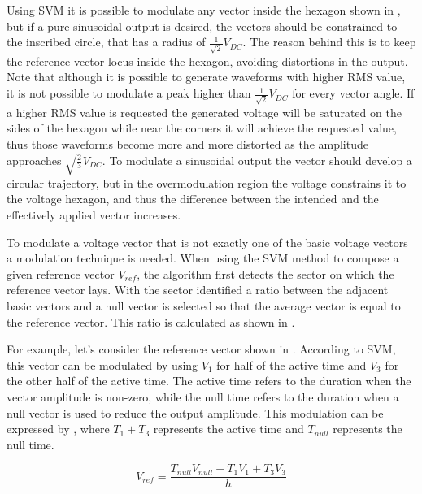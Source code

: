 \documentclass[9pt,conference]{IEEEtran}
\begin{document}
Using SVM it is possible to modulate any vector inside the hexagon shown in , but if a pure sinusoidal output is desired, the vectors should be constrained to the inscribed circle, that has a radius of $\frac{1}{\sqrt{2}} V_{DC}$. The reason behind this is to keep the reference vector locus inside the hexagon, avoiding distortions in the output. Note that although it is possible to generate waveforms with higher RMS value, it is not possible to modulate a peak higher than $\frac{1}{\sqrt{2}} V_{DC}$ for every vector angle. If a higher RMS value is requested the generated voltage will be saturated on the sides of the hexagon while near the corners it will achieve the requested value, thus those waveforms become more and more distorted as the amplitude approaches $\sqrt{\frac{2}{3}} V_{DC}$. To modulate a sinusoidal output the vector should develop a circular trajectory, but in the overmodulation region the voltage constrains it to the voltage hexagon, and thus the difference between the intended and the effectively applied vector increases.

To modulate a voltage vector that is not exactly one of the basic voltage vectors a modulation technique is needed. When using the SVM method to compose a given reference vector $V_{ref}$, the algorithm first detects the sector on which the reference vector lays. With the sector identified a ratio between the adjacent basic vectors and a null vector is selected so that the average vector is equal to the reference vector. This ratio is calculated as shown in .

For example, let's consider the reference vector shown in . According to SVM, this vector can be modulated by using $V_1$ for half of the active time and $V_3$ for the other half of the active time. The active time refers to the duration when the vector amplitude is non-zero, while the null time refers to the duration when a null vector is used to reduce the output amplitude. This modulation can be expressed by , where $T_1+T_3$ represents the active time and $T_{null}$ represents the null time.

\begin{equation}
	V_{ref} = \frac{T_{null} V_{null} + T_1 V_1  + T_3 V_3}{h}
	\label{eq:svm_vref}
\end{equation}

\end{document}
